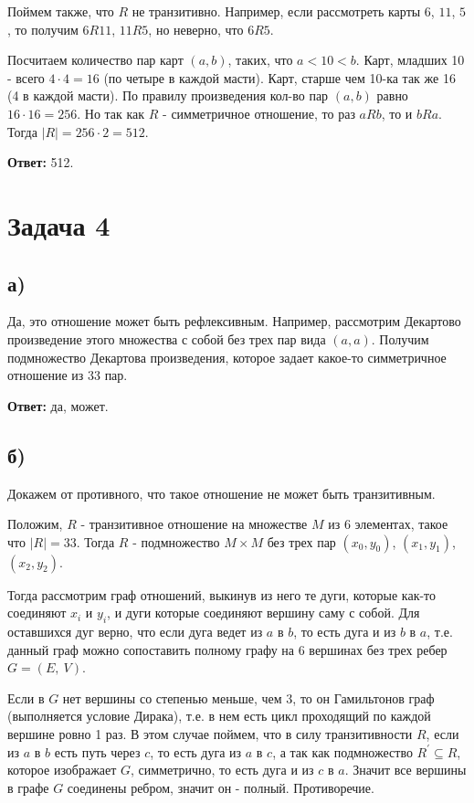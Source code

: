 \documentclass{article}
\begin{document}
	Поймем также, что $R$ не транзитивно. Например, если рассмотреть карты $6$, $11$, $5$, то получим $6 R 11$, $11 R 5$, но неверно, что $6 R 5$. 
	
	Посчитаем количество пар карт $(a, b)$, таких, что $a < 10 < b$. Карт, младших 10 - всего $4 \cdot 4 = 16$ (по четыре в каждой масти). Карт, старше чем 10-ка так же 16 (4 в каждой масти). По правилу произведения кол-во пар $(a, b)$ равно $16 \cdot 16 = 256$. Но так как $R$ - симметричное отношение, то раз $a R b$, то и $b R a$. Тогда $|R| = 256 \cdot 2 = 512$.
	
	\textbf{Ответ:} 512.
	
	\section{Задача 4}
	
	\subsection {а)} 
	Да, это отношение может быть рефлексивным. Например, рассмотрим Декартово произведение этого множества с собой без трех пар вида $(a, a)$. Получим подмножество Декартова произведения, которое задает какое-то симметричное отношение из 33 пар.
	
	\textbf{Ответ:} да, может.

	\subsection{б)}
	Докажем от противного, что такое отношение не может быть транзитивным. 
	
	Положим, $R$ - транзитивное отношение на множестве $M$ из 6 элементах, такое что $|R| = 33$. Тогда $R$ - подмножество $M \times M$ без трех пар $(x_0, y_0)$, $(x_1, y_1)$, $(x_2, y_2)$. 
	
	Тогда рассмотрим граф отношений, выкинув из него те дуги, которые как-то соединяют $x_i$ и $y_i$, и дуги которые соединяют вершину саму с собой. Для оставшихся дуг верно, что если дуга ведет из $a$ в $b$, то есть дуга и из $b$ в $a$, т.е. данный граф можно сопоставить полному графу на 6 вершинах без трех ребер  $G = (E,\ V)$.
	
	Если в $G$ нет вершины со степенью меньше, чем $3$, то он Гамильтонов граф (выполняется условие Дирака), т.е. в нем есть цикл проходящий по каждой вершине ровно 1 раз. В этом случае поймем, что в силу транзитивности $R$, если из $a$ в $b$ есть путь через $c$, то есть дуга из $a$ в $c$, а так как подмножество  $R^{\prime} \subseteq R$, которое изображает $G$, симметрично, то есть дуга и из $c$ в $a$. Значит все вершины в графе $G$ соединены ребром, значит он - полный. Противоречие.
	
\end{document}
